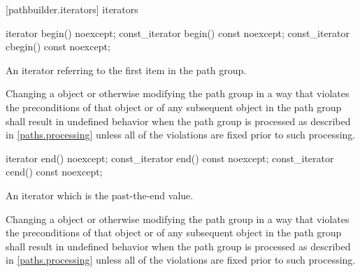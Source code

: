  [pathbuilder.iterators] { iterators}
    
\begin{itemdecl}
	iterator begin() noexcept;
	const_iterator begin() const noexcept;
	const_iterator cbegin() const noexcept;
\end{itemdecl}
\begin{itemdescr}
	\pnum
	\returns
	An iterator referring to the first  item in the path group.
	
	\pnum
	\remarks
	Changing a  object or otherwise modifying the path group in a way that violates the preconditions of that  object or of any subsequent  object in the path group shall result in undefined behavior when the path group is processed as described in \ref{paths.processing} unless all of the violations are fixed prior to such processing.
\end{itemdescr}

\begin{itemdecl}
	iterator end() noexcept;
	const_iterator end() const noexcept;
	const_iterator cend() const noexcept;
\end{itemdecl}
\begin{itemdescr}
	\pnum
	\returns
	An iterator which is the past-the-end value.
	
	\pnum
	\remarks
	Changing a  object or otherwise modifying the path group in a way that violates the preconditions of that  object or of any subsequent  object in the path group shall result in undefined behavior when the path group is processed as described in \ref{paths.processing} unless all of the violations are fixed prior to such processing.
\end{itemdescr}

